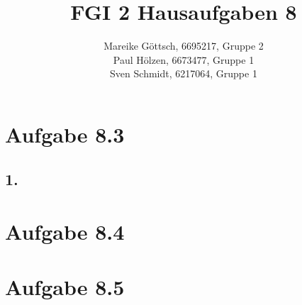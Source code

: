 \documentclass[12pt, paper=a4]{article}
\author{Mareike G\"ottsch, 6695217, Gruppe 2\\Paul H\"olzen, 6673477, Gruppe 1\\Sven Schmidt, 6217064, Gruppe 1}
\title{FGI 2 Hausaufgaben 8}
\begin{document}
\maketitle

\section*{Aufgabe 8.3}
\subsection*{1.}



\section*{Aufgabe 8.4}


\section*{Aufgabe 8.5}
\end{document}

